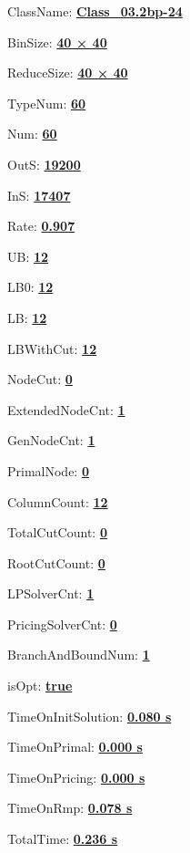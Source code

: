 \documentclass[11pt]{article}
\begin{document}
\pagestyle{empty}


ClassName: \underline{\textbf{Class_03.2bp-24}}
\par
BinSize: \underline{\textbf{40 × 40}}
\par
ReduceSize: \underline{\textbf{40 × 40}}
\par
TypeNum: \underline{\textbf{60}}
\par
Num: \underline{\textbf{60}}
\par
OutS: \underline{\textbf{19200}}
\par
InS: \underline{\textbf{17407}}
\par
Rate: \underline{\textbf{0.907}}
\par
UB: \underline{\textbf{12}}
\par
LB0: \underline{\textbf{12}}
\par
LB: \underline{\textbf{12}}
\par
LBWithCut: \underline{\textbf{12}}
\par
NodeCut: \underline{\textbf{0}}
\par
ExtendedNodeCnt: \underline{\textbf{1}}
\par
GenNodeCnt: \underline{\textbf{1}}
\par
PrimalNode: \underline{\textbf{0}}
\par
ColumnCount: \underline{\textbf{12}}
\par
TotalCutCount: \underline{\textbf{0}}
\par
RootCutCount: \underline{\textbf{0}}
\par
LPSolverCnt: \underline{\textbf{1}}
\par
PricingSolverCnt: \underline{\textbf{0}}
\par
BranchAndBoundNum: \underline{\textbf{1}}
\par
isOpt: \underline{\textbf{true}}
\par
TimeOnInitSolution: \underline{\textbf{0.080 s}}
\par
TimeOnPrimal: \underline{\textbf{0.000 s}}
\par
TimeOnPricing: \underline{\textbf{0.000 s}}
\par
TimeOnRmp: \underline{\textbf{0.078 s}}
\par
TotalTime: \underline{\textbf{0.236 s}}
\par
\newpage


\end{document}
